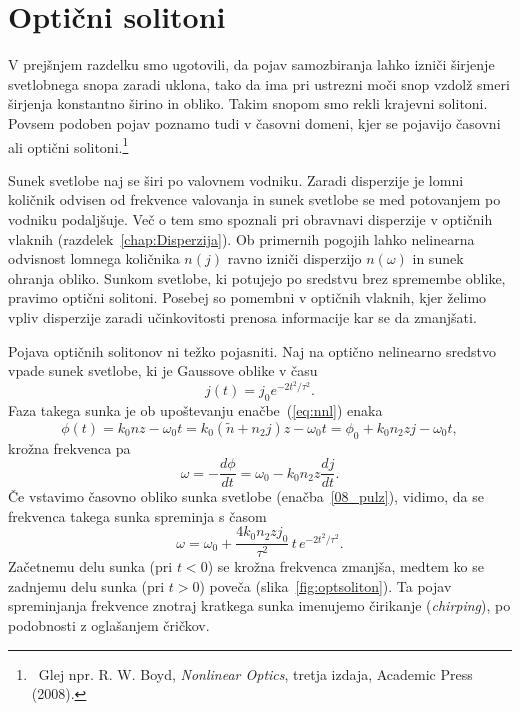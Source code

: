 \section{Optični solitoni}
\label{chap:soliton}
V prejšnjem razdelku smo ugotovili, da pojav samozbiranja lahko izniči širjenje 
svetlobnega snopa zaradi uklona, tako da ima pri
ustrezni moči snop vzdolž smeri širjenja konstantno širino in obliko. Takim snopom 
smo rekli krajevni solitoni. Povsem podoben pojav poznamo tudi v časovni 
domeni, kjer se pojavijo časovni ali optični solitoni.\footnote{~Glej npr. R. W. 
Boyd, {\it Nonlinear Optics}, tretja izdaja, Academic Press (2008).}

Sunek svetlobe  naj se širi po valovnem vodniku. Zaradi disperzije je lomni količnik
odvisen od frekvence valovanja in sunek svetlobe se med potovanjem po vodniku podaljšuje. 
Več o tem smo spoznali pri 
obravnavi disperzije v optičnih vlaknih (razdelek~\ref{chap:Disperzija}). 
Ob primernih pogojih lahko nelinearna odvisnost lomnega količnika $n(j)$ 
ravno izniči disperzijo $n(\omega)$ in sunek
ohranja obliko. Sunkom svetlobe, ki potujejo po sredstvu brez spremembe
oblike, pravimo optični solitoni. Posebej so pomembni v optičnih vlaknih, 
kjer želimo  vpliv disperzije zaradi učinkovitosti prenosa
informacije kar se da zmanjšati. 

Pojava optičnih solitonov ni težko pojasniti. Naj na optično nelinearno sredstvo
vpade sunek svetlobe, ki je Gaussove oblike v času
\begin{equation}
j(t) = j_0 e^{-2t^2/\tau^2}.
\label{08_pulz}
\end{equation}
Faza takega sunka je ob upoštevanju enačbe~(\ref{eq:nnl}) enaka
\begin{equation}
\phi (t) = k_0 n z - \omega_0 t = k_0 (\tilde{n} + n_2 j)z - \omega_0 t = 
\phi_0 + k_0 n_2 z j - \omega_0 t,
\end{equation}
krožna frekvenca pa 
\begin{equation}
\omega = -\frac{d\phi}{dt} = \omega_0 - k_0 n_2 z \frac{dj}{dt}.
\end{equation}
Če vstavimo časovno obliko sunka svetlobe (enačba~\ref{08_pulz}), vidimo, da se 
frekvenca takega sunka spreminja s časom
\begin{equation}
\omega = \omega_0 + \frac{4k_0 n_2 z j_0}{\tau^2} \, t \, e^{-2t^2/\tau^2}.
\label{eq:chirpi}
\end{equation}
Začetnemu delu sunka (pri $t<0$) se krožna frekvenca zmanjša, medtem ko se zadnjemu delu sunka
(pri $t>0$) poveča (slika~\ref{fig:optsoliton}). 
Ta pojav spreminjanja frekvence znotraj kratkega sunka imenujemo čirikanje
({\it chirping}),  po podobnosti z oglašanjem čričkov.

